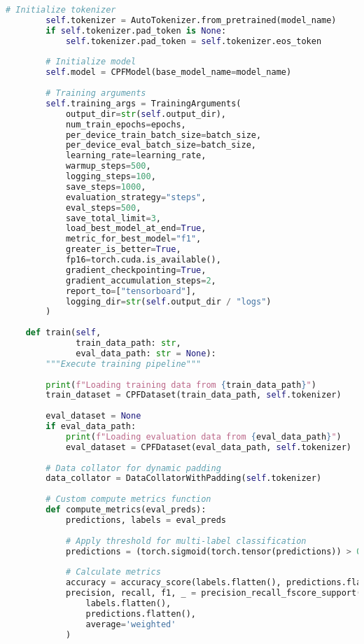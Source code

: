 \documentclass[11pt,a4paper]{article}
\begin{document}
\begin{lstlisting}[language=Python, caption=CPF Model Training Pipeline]
        # Initialize tokenizer
        self.tokenizer = AutoTokenizer.from_pretrained(model_name)
        if self.tokenizer.pad_token is None:
            self.tokenizer.pad_token = self.tokenizer.eos_token
        
        # Initialize model
        self.model = CPFModel(base_model_name=model_name)
        
        # Training arguments
        self.training_args = TrainingArguments(
            output_dir=str(self.output_dir),
            num_train_epochs=epochs,
            per_device_train_batch_size=batch_size,
            per_device_eval_batch_size=batch_size,
            learning_rate=learning_rate,
            warmup_steps=500,
            logging_steps=100,
            save_steps=1000,
            evaluation_strategy="steps",
            eval_steps=500,
            save_total_limit=3,
            load_best_model_at_end=True,
            metric_for_best_model="f1",
            greater_is_better=True,
            fp16=torch.cuda.is_available(),
            gradient_checkpointing=True,
            gradient_accumulation_steps=2,
            report_to=["tensorboard"],
            logging_dir=str(self.output_dir / "logs")
        )
    
    def train(self, 
              train_data_path: str,
              eval_data_path: str = None):
        """Execute training pipeline"""
        
        print(f"Loading training data from {train_data_path}")
        train_dataset = CPFDataset(train_data_path, self.tokenizer)
        
        eval_dataset = None
        if eval_data_path:
            print(f"Loading evaluation data from {eval_data_path}")
            eval_dataset = CPFDataset(eval_data_path, self.tokenizer)
        
        # Data collator for dynamic padding
        data_collator = DataCollatorWithPadding(self.tokenizer)
        
        # Custom compute metrics function
        def compute_metrics(eval_preds):
            predictions, labels = eval_preds
            
            # Apply threshold for multi-label classification
            predictions = (torch.sigmoid(torch.tensor(predictions)) > 0.5).float()
            
            # Calculate metrics
            accuracy = accuracy_score(labels.flatten(), predictions.flatten())
            precision, recall, f1, _ = precision_recall_fscore_support(
                labels.flatten(), 
                predictions.flatten(), 
                average='weighted'
            )
            

\end{lstlisting}
\end{document}
